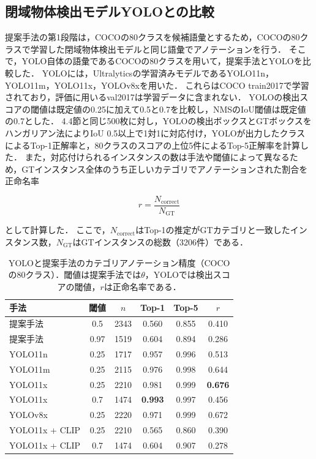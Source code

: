\subsection{閉域物体検出モデルYOLOとの比較}
提案手法の第1段階は，COCOの80クラスを候補語彙とするため，COCOの80クラスで学習した閉域物体検出モデルと同じ語彙でアノテーションを行う．
そこで，YOLO自体の語彙であるCOCOの80クラスを用いて，提案手法とYOLOを比較した．
YOLOには，Ultralytics\cite{ref_Ultralytics}の学習済みモデルであるYOLO11n，YOLO11m，YOLO11x，YOLOv8xを用いた．
これらはCOCO train2017で学習されており，評価に用いるval2017は学習データに含まれない．
YOLOの検出スコアの閾値は既定値の0.25に加えて0.5と0.7を比較し，NMSのIoU閾値は既定値の0.7とした．
4.4節と同じ500枚に対し，YOLOの検出ボックスとGTボックスをハンガリアン法によりIoU 0.5以上で1対1に対応付け，YOLOが出力したクラスによるTop-1正解率と，80クラスのスコアの上位5件によるTop-5正解率を計算した．
また，対応付けられるインスタンスの数は手法や閾値によって異なるため，GTインスタンス全体のうち正しいカテゴリでアノテーションされた割合を正命名率

\begin{equation}
    r = \frac{N_{\mathrm{correct}}}{N_{\mathrm{GT}}}
    \label{eq_annotation_recall}
\end{equation}

\noindent
として計算した．
ここで，$ N_{\mathrm{correct}} $はTop-1の推定がGTカテゴリと一致したインスタンス数，$ N_{\mathrm{GT}} $はGTインスタンスの総数（3206件）である．

\begin{table}[t]
    \centering
    \caption{YOLOと提案手法のカテゴリアノテーション精度（COCOの80クラス）．閾値は提案手法では$ \theta $，YOLOでは検出スコアの閾値，$ r $は正命名率である．}
    \label{tab_yolo_comparison}
    \footnotesize
    \setlength{\tabcolsep}{3pt}
    \begin{tabular}{lccccc}
        \toprule
        手法 & 閾値 & $ n $ & Top-1 & Top-5 & $ r $ \\
        \midrule
        提案手法          & 0.5  & 2343 & 0.560 & 0.855 & 0.410 \\
        提案手法          & 0.97 & 1519 & 0.604 & 0.894 & 0.286 \\
        \midrule
        YOLO11n          & 0.25 & 1717 & 0.957 & 0.996 & 0.513 \\
        YOLO11m          & 0.25 & 2115 & 0.976 & 0.998 & 0.644 \\
        YOLO11x          & 0.25 & 2210 & 0.981 & 0.999 & {\bf 0.676} \\
        YOLO11x          & 0.7  & 1474 & {\bf 0.993} & 0.997 & 0.456 \\
        YOLOv8x          & 0.25 & 2220 & 0.971 & 0.999 & 0.672 \\
        \midrule
        YOLO11x + CLIP   & 0.25 & 2210 & 0.565 & 0.860 & 0.390 \\
        YOLO11x + CLIP   & 0.7  & 1474 & 0.604 & 0.907 & 0.278 \\
        \bottomrule
    \end{tabular}
\end{table}

